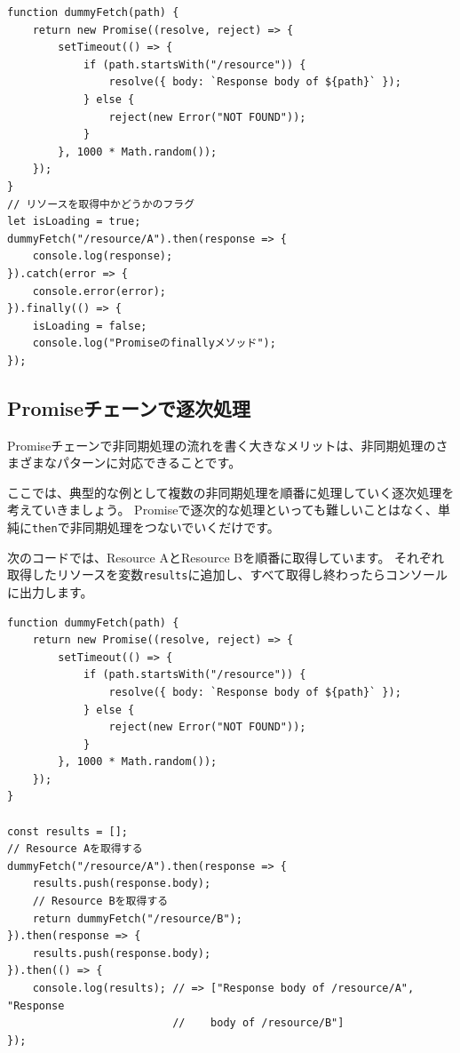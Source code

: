 \begin{lstlisting}
function dummyFetch(path) {
    return new Promise((resolve, reject) => {
        setTimeout(() => {
            if (path.startsWith("/resource")) {
                resolve({ body: `Response body of ${path}` });
            } else {
                reject(new Error("NOT FOUND"));
            }
        }, 1000 * Math.random());
    });
}
// リソースを取得中かどうかのフラグ
let isLoading = true;
dummyFetch("/resource/A").then(response => {
    console.log(response);
}).catch(error => {
    console.error(error);
}).finally(() => {
    isLoading = false;
    console.log("Promiseのfinallyメソッド");
});
\end{lstlisting}

\hypertarget{promise-sequential}{%
\subsection{Promiseチェーンで逐次処理}\label{promise-sequential}}

Promiseチェーンで非同期処理の流れを書く大きなメリットは、非同期処理のさまざまなパターンに対応できることです。

ここでは、典型的な例として複数の非同期処理を順番に処理していく逐次処理を考えていきましょう。
Promiseで逐次的な処理といっても難しいことはなく、単純に\texttt{then}で非同期処理をつないでいくだけです。

次のコードでは、Resource AとResource Bを順番に取得しています。
それぞれ取得したリソースを変数\texttt{results}に追加し、すべて取得し終わったらコンソールに出力します。

\begin{lstlisting}
function dummyFetch(path) {
    return new Promise((resolve, reject) => {
        setTimeout(() => {
            if (path.startsWith("/resource")) {
                resolve({ body: `Response body of ${path}` });
            } else {
                reject(new Error("NOT FOUND"));
            }
        }, 1000 * Math.random());
    });
}

const results = [];
// Resource Aを取得する
dummyFetch("/resource/A").then(response => {
    results.push(response.body);
    // Resource Bを取得する
    return dummyFetch("/resource/B");
}).then(response => {
    results.push(response.body);
}).then(() => {
    console.log(results); // => ["Response body of /resource/A", "Response 
                          //    body of /resource/B"]
});
\end{lstlisting}

